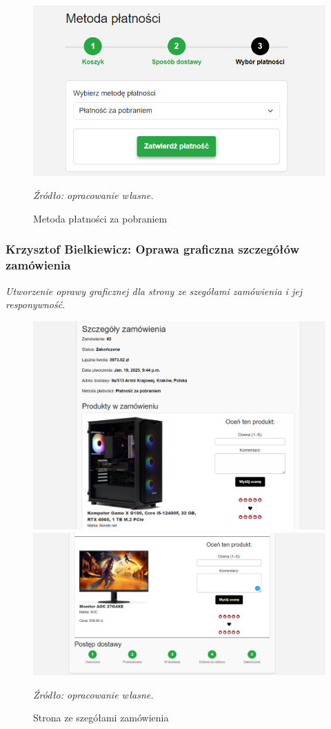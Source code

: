 \documentclass[12pt,a4paper,oneside]{article}
\theoremstyle{definition}
\numberwithin{equation}{section}
\begin{document}
\begin{figure}[H]
    \centering
    \includegraphics[width=0.8\columnwidth]{images/krzysztofBImages/cart/metody-płatności-za-pobraniem.png}
    \caption{Metoda płatności za pobraniem}
    \emph{Źródło: opracowanie własne.}
\end{figure}

\subsubsection{Krzysztof Bielkiewicz: Oprawa graficzna szczegółów zamówienia}
\label{1.3.11}
\textit{Utworzenie oprawy graficznej dla strony ze szegółami zamówienia i jej responywność.}

\begin{figure}[H]
    \centering
    \includegraphics[width=0.8\columnwidth]{images/krzysztofBImages/szczegóły-zamówieniaV1.png}
    \includegraphics[width=0.8\columnwidth]{images/krzysztofBImages/szczegóły-zamówieniaV2.png}
    \caption{Strona ze szegółami zamówienia}
    \emph{Źródło: opracowanie własne.}
\end{figure}
\end{document}
